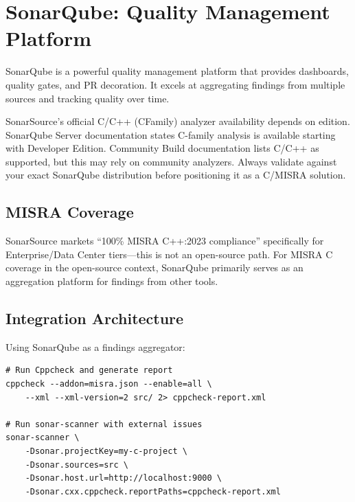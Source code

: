 \documentclass[11pt,letterpaper]{report}
\begin{document}
\section{SonarQube: Quality Management Platform}

SonarQube is a powerful quality management platform that provides dashboards, quality gates, and PR decoration. It excels at aggregating findings from multiple sources and tracking quality over time.

\begin{notebox}
SonarSource's official C/C++ (CFamily) analyzer availability depends on edition. SonarQube Server documentation states C-family analysis is available starting with Developer Edition. Community Build documentation lists C/C++ as supported, but this may rely on community analyzers. Always validate against your exact SonarQube distribution before positioning it as a C/MISRA solution.
\end{notebox}

\subsection{MISRA Coverage}

SonarSource markets ``100\% MISRA C++:2023 compliance'' specifically for Enterprise/Data Center tiers---this is not an open-source path. For MISRA C coverage in the open-source context, SonarQube primarily serves as an aggregation platform for findings from other tools.

\subsection{Integration Architecture}

Using SonarQube as a findings aggregator:

\begin{lstlisting}[style=bashstyle]
# Run Cppcheck and generate report
cppcheck --addon=misra.json --enable=all \
    --xml --xml-version=2 src/ 2> cppcheck-report.xml

# Run sonar-scanner with external issues
sonar-scanner \
    -Dsonar.projectKey=my-c-project \
    -Dsonar.sources=src \
    -Dsonar.host.url=http://localhost:9000 \
    -Dsonar.cxx.cppcheck.reportPaths=cppcheck-report.xml
\end{lstlisting}

\end{document}
